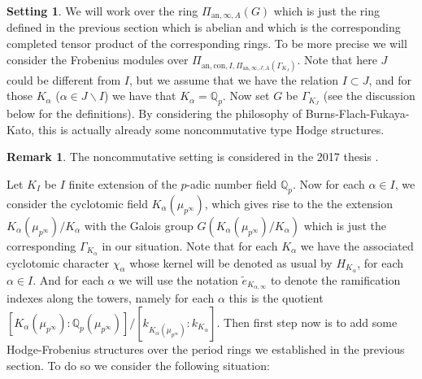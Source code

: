 \documentclass[12pt]{amsart}
\theoremstyle{definition}
\newtheorem{remark}[theorem]{Remark}
\numberwithin{equation}{section}
\newtheorem{setting}[theorem]{Setting}
\begin{document}
\begin{setting} \label{setting3.1}
We will work over the ring $\Pi_{\mathrm{an},\infty,A}(G)$ which is just the ring defined in the previous section which is abelian and which is the corresponding completed tensor product of the corresponding rings. To be more precise we will consider the Frobenius modules over $\Pi_{\mathrm{an},\mathrm{con},I,\Pi_{\mathrm{an},\infty,J,A}(\Gamma_{K_J})}$. Note that here $J$ could be different from $I$, but we assume that we have the relation $I\subset J$, and for those $K_\alpha$ ($\alpha\in J\backslash I$) we have that $K_\alpha=\mathbb{Q}_p$. Now set $G$ be $\Gamma_{K_J}$ (see the discussion below for the definitions). By considering the philosophy of Burns-Flach-Fukaya-Kato, this is actually already some noncommutative type Hodge structures.	
\end{setting}
	
	
\begin{remark}
The noncommutative setting is considered in the 2017 thesis \cite{Zah1}. 	
\end{remark}







\indent Let $K_I$ be $I$ finite extension of the $p$-adic number field $\mathbb{Q}_p$. Now for each $\alpha\in I$, we consider the cyclotomic field $K_{\alpha}(\mu_{p^\infty})$, which gives rise to the the extension $K_{\alpha}(\mu_{p^\infty})/K_\alpha$ with the Galois group $G(K_{\alpha}(\mu_{p^\infty})/K_\alpha)$ which is just the corresponding $\Gamma_{K_\alpha}$ in our situation. Note that for each $K_\alpha$ we have the associated cyclotomic character $\chi_{\alpha}$ whose kernel will be denoted as usual by $H_{K_\alpha}$, for each $\alpha\in I$. And for each $\alpha$ we will use the notation $\widetilde{e}_{K_{\alpha,\infty}}$ to denote the ramification indexes along the towers, namely for each $\alpha$ this is the quotient $[K_{\alpha}(\mu_{p^\infty}):\mathbb{Q}_p(\mu_{p^\infty})]/[k_{K_{\alpha}(\mu_{p^\infty})}:k_{K_\alpha}]$. Then first step now is to add some Hodge-Frobenius structures over the period rings we established in the previous section. To do so we consider the following situation:
\end{document}
